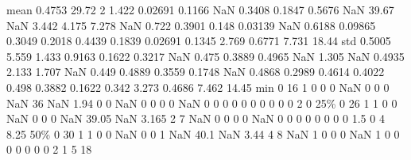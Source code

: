 \documentclass[11pt]{article}
\begin{document}
\begin{codeoutput}
mean     0.4753 29.72        2  1.422                0.02691            0.1166          NaN         0.3408            0.1847            0.5676           NaN           39.67    NaN        3.442   4.175   7.278                 NaN 0.722               0.3901              0.148                       0.03139             NaN                      0.6188                      0.09865              0.3049                      0.2018         0.4439                 0.1839     0.02691        0.1345                2.769         0.6771       7.731            18.44
std      0.5005 5.559    1.433 0.9163                 0.1622            0.3217          NaN          0.475            0.3889            0.4965           NaN           1.305    NaN       0.4935   2.133   1.707                 NaN 0.449               0.4889             0.3559                        0.1748             NaN                      0.4868                       0.2989              0.4614                      0.4022          0.498                 0.3882      0.1622         0.342                3.273         0.4686       7.462            14.45
min           0    16        1      0                      0                 0          NaN              0                 0                 0           NaN              36    NaN         1.94       0       0                 NaN     0                    0                  0                             0             NaN                           0                            0                   0                           0              0                      0           0             0                    0              0           2                0
25\%           0    26        1      1                      0                 0          NaN              0                 0                 0           NaN           39.05    NaN        3.165       2       7                 NaN     0                    0                  0                             0             NaN                           0                            0                   0                           0              0                      0           0             0                  1.5              0           4             8.25
50\%           0    30        1      1                      0                 0          NaN              0                 0                 1           NaN            40.1    NaN         3.44       4       8                 NaN     1                    0                  0                             0             NaN                           1                            0                   0                           0              0                      0           0             0                    2              1           5               18

\end{codeoutput}
\end{document}
